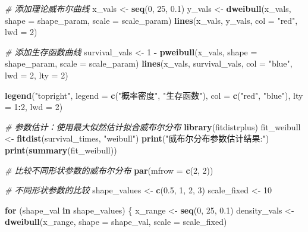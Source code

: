 \documentclass[
  twoside]{book}
\newenvironment{Shaded}{\begin{snugshade}}{\end{snugshade}}
\newcommand{\AttributeTok}[1]{\textcolor[rgb]{0.13,0.29,0.53}{#1}}
\newcommand{\CommentTok}[1]{\textcolor[rgb]{0.56,0.35,0.01}{\textit{#1}}}
\newcommand{\ControlFlowTok}[1]{\textcolor[rgb]{0.13,0.29,0.53}{\textbf{#1}}}
\newcommand{\DecValTok}[1]{\textcolor[rgb]{0.00,0.00,0.81}{#1}}
\newcommand{\FloatTok}[1]{\textcolor[rgb]{0.00,0.00,0.81}{#1}}
\newcommand{\FunctionTok}[1]{\textcolor[rgb]{0.13,0.29,0.53}{\textbf{#1}}}
\newcommand{\NormalTok}[1]{#1}
\newcommand{\OtherTok}[1]{\textcolor[rgb]{0.56,0.35,0.01}{#1}}
\newcommand{\SpecialCharTok}[1]{\textcolor[rgb]{0.81,0.36,0.00}{\textbf{#1}}}
\newcommand{\StringTok}[1]{\textcolor[rgb]{0.31,0.60,0.02}{#1}}
\begin{document}
\begin{Shaded}
\begin{Highlighting}[]
\CommentTok{\# 添加理论威布尔曲线}
\NormalTok{x\_vals }\OtherTok{\textless{}{-}} \FunctionTok{seq}\NormalTok{(}\DecValTok{0}\NormalTok{, }\DecValTok{25}\NormalTok{, }\FloatTok{0.1}\NormalTok{)}
\NormalTok{y\_vals }\OtherTok{\textless{}{-}} \FunctionTok{dweibull}\NormalTok{(x\_vals, }\AttributeTok{shape =}\NormalTok{ shape\_param, }\AttributeTok{scale =}\NormalTok{ scale\_param)}
\FunctionTok{lines}\NormalTok{(x\_vals, y\_vals, }\AttributeTok{col =} \StringTok{"red"}\NormalTok{, }\AttributeTok{lwd =} \DecValTok{2}\NormalTok{)}

\CommentTok{\# 添加生存函数曲线}
\NormalTok{survival\_vals }\OtherTok{\textless{}{-}} \DecValTok{1} \SpecialCharTok{{-}} \FunctionTok{pweibull}\NormalTok{(x\_vals, }\AttributeTok{shape =}\NormalTok{ shape\_param, }\AttributeTok{scale =}\NormalTok{ scale\_param)}
\FunctionTok{lines}\NormalTok{(x\_vals, survival\_vals, }\AttributeTok{col =} \StringTok{"blue"}\NormalTok{, }\AttributeTok{lwd =} \DecValTok{2}\NormalTok{, }\AttributeTok{lty =} \DecValTok{2}\NormalTok{)}

\FunctionTok{legend}\NormalTok{(}\StringTok{"topright"}\NormalTok{, }\AttributeTok{legend =} \FunctionTok{c}\NormalTok{(}\StringTok{"概率密度"}\NormalTok{, }\StringTok{"生存函数"}\NormalTok{),}
       \AttributeTok{col =} \FunctionTok{c}\NormalTok{(}\StringTok{"red"}\NormalTok{, }\StringTok{"blue"}\NormalTok{), }\AttributeTok{lty =} \DecValTok{1}\SpecialCharTok{:}\DecValTok{2}\NormalTok{, }\AttributeTok{lwd =} \DecValTok{2}\NormalTok{)}

\CommentTok{\# 参数估计：使用最大似然估计拟合威布尔分布}
\FunctionTok{library}\NormalTok{(fitdistrplus)}
\NormalTok{fit\_weibull }\OtherTok{\textless{}{-}} \FunctionTok{fitdist}\NormalTok{(survival\_times, }\StringTok{"weibull"}\NormalTok{)}
\FunctionTok{print}\NormalTok{(}\StringTok{"威布尔分布参数估计结果:"}\NormalTok{)}
\FunctionTok{print}\NormalTok{(}\FunctionTok{summary}\NormalTok{(fit\_weibull))}

\CommentTok{\# 比较不同形状参数的威布尔分布}
\FunctionTok{par}\NormalTok{(}\AttributeTok{mfrow =} \FunctionTok{c}\NormalTok{(}\DecValTok{2}\NormalTok{, }\DecValTok{2}\NormalTok{))}

\CommentTok{\# 不同形状参数的比较}
\NormalTok{shape\_values }\OtherTok{\textless{}{-}} \FunctionTok{c}\NormalTok{(}\FloatTok{0.5}\NormalTok{, }\DecValTok{1}\NormalTok{, }\DecValTok{2}\NormalTok{, }\DecValTok{3}\NormalTok{)}
\NormalTok{scale\_fixed }\OtherTok{\textless{}{-}} \DecValTok{10}

\ControlFlowTok{for}\NormalTok{ (shape\_val }\ControlFlowTok{in}\NormalTok{ shape\_values) \{}
\NormalTok{  x\_range }\OtherTok{\textless{}{-}} \FunctionTok{seq}\NormalTok{(}\DecValTok{0}\NormalTok{, }\DecValTok{25}\NormalTok{, }\FloatTok{0.1}\NormalTok{)}
\NormalTok{  density\_vals }\OtherTok{\textless{}{-}} \FunctionTok{dweibull}\NormalTok{(x\_range, }\AttributeTok{shape =}\NormalTok{ shape\_val, }\AttributeTok{scale =}\NormalTok{ scale\_fixed)}


\end{Highlighting}
\end{Shaded}
\end{document}
